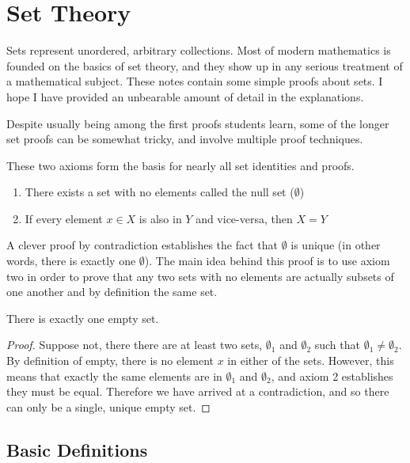 \documentclass{standalone}
\begin{document}
\section{Set Theory}

Sets represent unordered, arbitrary collections. Most of modern mathematics is
founded on the basics of set theory, and they show up in any serious treatment
of a mathematical subject. These notes contain some simple proofs about sets. I
hope I have provided an unbearable amount of detail in the explanations.

Despite usually being among the first proofs students learn, some of the longer
set proofs can be somewhat tricky, and involve multiple proof techniques.

\begin{definition}
  These two axioms form the basis for nearly all set identities and proofs.

  \begin{enumerate}
    \item There exists a set with no elements called the null set ($\emptyset$)
    \item If every element $x \in X$ is also in $Y$ and vice-versa, then $X = Y$
  \end{enumerate}
\end{definition}

A clever proof by contradiction establishes the fact that $\emptyset$ is unique
(in other words, there is exactly one $\emptyset$). The main idea behind this
proof is to use axiom two in order to prove that any two sets with no elements
are actually subsets of one another and by definition the same set.

\begin{theorem}
  There is exactly one empty set.
\end{theorem}

\begin{proof}
  Suppose not, there there are at least two sets, $\emptyset_1$ and $\emptyset_2$
  such that $\emptyset_1 \neq \emptyset_2$. By definition of empty, there is no
  element $x$ in either of the sets. However, this means that exactly the same
  elements are in $\emptyset_1$ and $\emptyset_2$, and axiom 2 establishes they
  must be equal. Therefore we have arrived at a contradiction, and so there can
  only be a single, unique empty set.
\end{proof}

\subsection{Basic Definitions}
\end{document}
